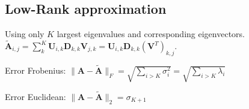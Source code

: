 \documentclass[a4paper, 11pt, landscape]{article}
\begin{document}
\begin{multicols*}{3}
\subsection{Low-Rank approximation}
Using only $K$ largest eigenvalues and corresponding eigenvectors. $\tilde{\mathbf{A}}_{i, j} = \sum_{k}^K \mathbf{U}_{i, k} \mathbf{D}_{k,k} \mathbf{V}_{j, k} = \mathbf{U}_{i, k} \mathbf{D}_{k,k} (\mathbf{V}^T)_{k, j}$.
\begin{compactdesc}
	\item[Error Frobenius:] $\|\mathbf{A} - \tilde{\mathbf{A}}\|_F = \sqrt{\sum_{i > K} \sigma_i^2} = \sqrt{\sum_{i > K} \lambda_i}$
	\item[Error Euclidean:] $\|\mathbf{A} - \tilde{\mathbf{A}}\|_2 = \sigma_{K+1}$
\end{compactdesc}



\end{multicols*}
\end{document}
